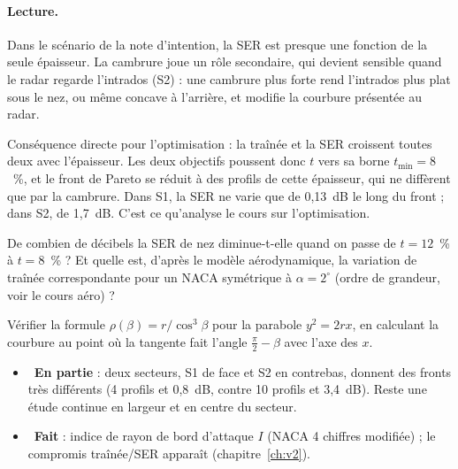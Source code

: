 \paragraph{Lecture.} Dans le scénario de la note d'intention, la SER est presque une fonction de la seule épaisseur. La cambrure joue un rôle secondaire, qui devient sensible quand le radar regarde l'intrados (S2) : une cambrure plus forte rend l'intrados plus plat sous le nez, ou même concave à l'arrière, et modifie la courbure présentée au radar.

\begin{projet}
Conséquence directe pour l'optimisation : la traînée et la SER croissent toutes deux avec l'épaisseur. Les deux objectifs poussent donc $t$ vers sa borne $t_{\min}=8$~\%, et le front de Pareto se réduit à des profils de cette épaisseur, qui ne diffèrent que par la cambrure. Dans S1, la SER ne varie que de 0,13~dB le long du front ; dans S2, de 1,7~dB. C'est ce qu'analyse le cours sur l'optimisation.
\end{projet}

\exercices
\begin{exercice}
De combien de décibels la SER de nez diminue-t-elle quand on passe de $t=12$~\% à $t=8$~\% ? Et quelle est, d'après le modèle aérodynamique, la variation de traînée correspondante pour un NACA symétrique à $\alpha=2^\circ$ (ordre de grandeur, voir le cours aéro) ?
\end{exercice}
\begin{exercice}
Vérifier la formule $\rho(\beta)=r/\cos^3\beta$ pour la parabole $y^2=2rx$, en calculant la courbure au point où la tangente fait l'angle $\frac\pi2-\beta$ avec l'axe des $x$.
\end{exercice}

\begin{pistes}
\begin{itemize}
\item {}~\textbf{En partie} : deux secteurs, S1 de face et S2 en contrebas, donnent des fronts très différents (4 profils et 0,8~dB, contre 10 profils et 3,4~dB). Reste une étude continue en largeur et en centre du secteur.
\item {}~\textbf{Fait} : indice de rayon de bord d'attaque $I$ (NACA 4 chiffres modifiée) ; le compromis traînée/SER apparaît (chapitre~\ref{ch:v2}).
\end{itemize}
\end{pistes}
